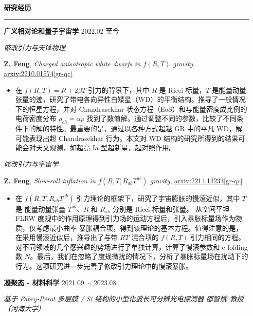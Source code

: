 \documentclass[12pt]{article}
\renewcommand*{\section}[1]{
    ~\\ \noindent \textbf{#1} \medskip \hrule \medskip
}
\begin{document}

\section{研究经历}

\textbf{广义相对论和量子宇宙学} \hfill 2022.02 至今

\smallskip \quad \textit{修改引力与天体物理}

\textbf{Z. Feng}, \textit{Charged anisotropic white dwarfs in $f\left({R}, {T}\right)$ gravity}, \href{https://arxiv.org/abs/2210.01574}{arxiv:2210.01574[gr-qc]}

\begin{itemize}
    \item 在 $f\left(R, T\right) = R + 2 \beta T$ 引力的背景下，其中 $R$ 是 Ricci 标量，$T$ 是能量动量张量的迹，研究了带电各向异性白矮星（WD）的平衡结构。推导了一般情况下的恒星方程，并对 Chandrasekhar 状态方程（EoS）和与能量密度成比例的电荷密度分布 $\rho_{ch} = \alpha \rho$ 找到了数值解。通过调整不同的参数，比较了不同条件下的解的特性。最重要的是，通过以各种方式超越 GR 中的平凡 WD，解可能表现出超 Chandrasekhar 行为。本文对 WD 结构的研究所得到的结果可能会对天文观测，如超亮 Ia 型超新星，起对照作用。
\end{itemize}

\smallskip \quad \textit{修改引力与宇宙学}

\textbf{Z. Feng}, \textit{Slow-roll inflation in $f\left(R, T, R_{ab}T^{ab}\right)$ gravity}, \href{https://arxiv.org/abs/2211.13233}{arxiv:2211.13233[gr-qc]}

\begin{itemize}
    \item 在 $f\left(R, T, R_{ab}T^{ab}\right)$ 引力理论的框架下，研究了宇宙膨胀的慢滚近似，其中 $T$ 是 能量动量张量 $T^{ab}$、$R$ 和 $R_{ab}$ 分别是 Ricci 标量和张量。 从空间平坦 FLRW 度规中的作用原理得到引力场的运动方程后，引入暴胀标量场作为物质，仅考虑最小曲率-暴胀耦合项，得到该理论的基本方程。值得注意的是，在采用慢滚近似后，推导出了与带 $RT$ 混合项的 $f(R, T)$ 引力相同的方程。对不同领域的几个感兴趣的势场进行了单独计算，计算了慢滚参数和 e-folding 数 $N$。最后，我们在忽略了度规微扰的情况下，分析了暴胀标量场在扰动下的行为。这项研究进一步完善了修改引力理论中的慢滚暴胀。
\end{itemize}

\medskip \textbf{凝聚态 - 材料科学} \hfill 2021.09 $\sim$ 2023.08

\smallskip \quad \textit{基于 Fabry-P\'{e}rot 多层膜 / Si 结构的小型化波长可分辨光电探测器 \hfill 邵智斌\ 教授（河海大学）}
\end{document}
